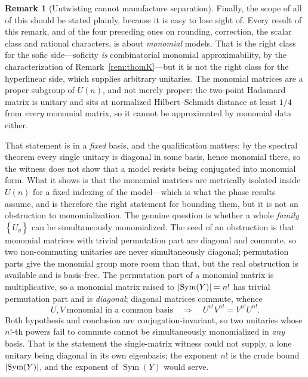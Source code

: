 \documentclass[11pt]{amsart}
\theoremstyle{definition}
\newtheorem{remark}[theorem]{Remark}
\theoremstyle{plain}
\newcommand{\Sym}{\operatorname{Sym}}
\DeclarePairedDelimiter{\abs}{\lvert}{\rvert}
\newcommand{\set}[1]{\left\{#1\right\}}
\begin{document}
\begin{remark}[Untwisting cannot manufacture separation]
Finally, the scope of all of this should be stated plainly, because it is easy to lose sight of.  Every result of this remark, and of the four preceding ones on rounding, correction, the scalar class and rational characters, is about \emph{monomial} models.  That is the right class for the sofic side---soficity \emph{is} combinatorial monomial approximability, by the characterization of Remark~\ref{rem:thomK}---but it is not the right class for the hyperlinear side, which supplies arbitrary unitaries.  The monomial matrices are a proper subgroup of \(U(n)\), and not merely proper: the two-point Hadamard matrix is unitary and sits at normalized Hilbert--Schmidt distance at least \(1/4\) from \emph{every} monomial matrix, so it cannot be approximated by monomial data either.

That statement is in a \emph{fixed} basis, and the qualification matters: by the spectral theorem every single unitary is diagonal in some basis, hence monomial there, so the witness does not show that a model resists being conjugated into monomial form.  What it shows is that the monomial matrices are metrically isolated inside \(U(n)\) for a fixed indexing of the model---which is what the phase results assume, and is therefore the right statement for bounding them, but it is not an obstruction to monomialization.  The genuine question is whether a whole \emph{family} \(\set{U_g}\) can be simultaneously monomialized.  The seed of an obstruction is that monomial matrices with trivial permutation part are diagonal and commute, so two non-commuting unitaries are never simultaneously diagonal; permutation parts give the monomial group more room than that, but the real obstruction is available and is basis-free.  The permutation part of a monomial matrix is multiplicative, so a monomial matrix raised to \(\abs{\Sym(Y)}=n!\) has trivial permutation part and is \emph{diagonal}; diagonal matrices commute, whence
\[
 U,V\ \text{monomial in a common basis}\quad\Longrightarrow\quad U^{n!}V^{n!}=V^{n!}U^{n!}.
\]
Both hypothesis and conclusion are conjugation-invariant, so two unitaries whose \(n!\)-th powers fail to commute cannot be simultaneously monomialized in \emph{any} basis.  That is the statement the single-matrix witness could not supply, a lone unitary being diagonal in its own eigenbasis; the exponent \(n!\) is the crude bound \(\abs{\Sym(Y)}\), and the exponent of \(\Sym(Y)\) would serve.


\end{remark}
\end{document}
